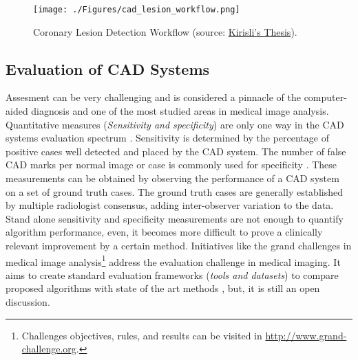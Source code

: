 \begin{figure}[htbp]
	\centering
		\texttt{[image: ./Figures/cad\_lesion\_workflow.png]}
	\caption[Coronary Lesion Detection Workflow]{Coronary Lesion Detection Workflow (source: \href{http://www.bigr.nl/publication/880}{Kirisli's Thesis}).}
	\label{fig:cad_wf}
\end{figure}

\subsection{Evaluation of CAD Systems}

Assesment can be very challenging and is considered a pinnacle of the computer-aided diagnosis and one of the most studied areas in medical image analysis. Quantitative measures (\textit{Sensitivity and specificity}) are only one way in the CAD systems evaluation spectrum \citep{Ginneken2011}. Sensitivity is determined by the percentage of positive cases well detected and placed by the CAD system. The number of false CAD marks per normal image or case is commonly used for specificity \citep{Castellino2005}. These measurements can be obtained by observing the performance of a CAD system on a set of ground truth cases. The ground truth cases are generally established by multiple radiologist consensus, adding inter-observer variation to the data. Stand alone sensitivity and specificity measurements are not enough to quantify algorithm performance, even, it becomes more difficult to prove a clinically relevant improvement by a certain method. 
Initiatives like the grand challenges in medical image analysis\footnote{Challenges objectives, rules, and results can be visited in \href{http://www.grand-challenge.org}{http://www.grand-challenge.org}.} address the evaluation challenge in medical imaging. It aims to create standard evaluation frameworks (\textit{tools and datasets}) to compare proposed algorithms with state of the art methods \citep{Hameeteman2011, Schaap2009, Kirisli2013} , but, it is still an open discussion.


